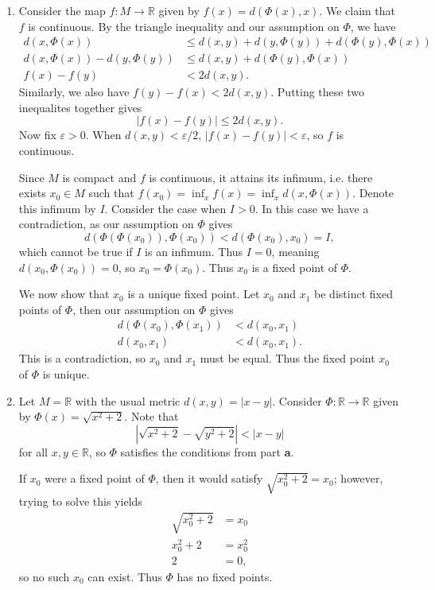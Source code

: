 \documentclass[10pt]{amsart}
\begin{document}
\begin{enumerate}
	\item Consider the map $f:M \to \mathbb{R}$ given by $f(x) = d(\Phi(x),x)$. We claim that $f$ is continuous. By the triangle inequality and our assumption on $\Phi$, we have
		\begin{align*}
			d(x,\Phi(x)) &\leq d(x,y) + d(y,\Phi(y)) + d(\Phi(y), \Phi(x)) \\
			d(x,\Phi(x)) - d(y,\Phi(y)) &\leq d(x,y) + d(\Phi(y), \Phi(x)) \\
			f(x) - f(y) &< 2 d(x,y).
		\end{align*}
		Similarly, we also have $f(y) - f(x) < 2 d(x,y)$. Putting these two inequalites together gives
		\[
			|f(x) - f(y)| \leq 2 d(x,y).
		\] Now fix $\varepsilon >0$. When $d(x,y) < \varepsilon/2$, $|f(x)-f(y)| < \varepsilon$, so $f$ is continuous.

		Since $M$ is compact and $f$ is continuous, it attains its infimum, i.e. there exists $x_0 \in M$ such that $f(x_0) = \inf_x f(x) = \inf_x d(x, \Phi(x))$. Denote this infimum by $I$. Consider the case when $I>0$. In this case we have a contradiction, as our assumption on $\Phi$ gives
		\[
			d(\Phi(\Phi(x_0)), \Phi(x_0)) < d(\Phi(x_0), x_0) = I,
		\] which cannot be true if $I$ is an infimum. Thus $I=0$, meaning $d(x_0, \Phi(x_0)) = 0$, so $x_0 = \Phi(x_0)$. Thus $x_0$ is a fixed point of $\Phi$.

		We now show that $x_0$ is a unique fixed point. Let $x_0$ and $x_1$ be distinct fixed points of $\Phi$, then our assumption on $\Phi$ gives
		\begin{align*}
			d(\Phi(x_0), \Phi(x_1)) &< d(x_0, x_1) \\
			d(x_0, x_1) &< d(x_0, x_1).
		\end{align*}
		This is a contradiction, so $x_0$ and $x_1$ must be equal. Thus the fixed point $x_0$ of $\Phi$ is unique.

	\item Let $M= \mathbb{R}$ with the usual metric $d(x,y) = |x-y|$. Consider $\Phi:\mathbb{R} \to \mathbb{R}$ given by $\Phi(x) = \sqrt{x^2 + 2} $. Note that
		\[
		\left| \sqrt{x^2+2} -\sqrt{y^2+2}  \right| < |x-y|
		\] for all $x,y \in \mathbb{R}$, so $\Phi$ satisfies the conditions from part  \textbf{a}.

		If $x_0$ were a fixed point of $\Phi$, then it would satisfy $\sqrt{x_0^2 +2} =x_0$; however, trying to solve this yields
		\begin{align*}
			\sqrt{x_0^2 +2} &= x_0 \\
			x_0^2 + 2 &= x_0^2 \\
			2 &= 0,
		\end{align*}
		so no such $x_0$ can exist. Thus $\Phi$ has no fixed points.
\end{enumerate}
\end{document}
